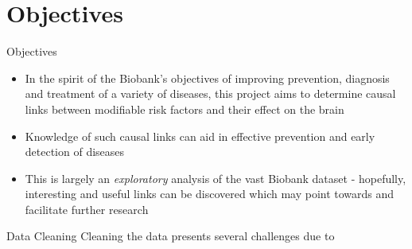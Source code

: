 \documentclass[10pt]{beamer} %
\begin{document}
\section{Objectives}
\begin{frame}[plain]{Objectives}
\begin{itemize}
\item In the spirit of the Biobank's objectives of improving prevention, diagnosis and treatment of a variety of diseases, this project aims to determine causal links between modifiable risk factors and their effect on the brain \\

\vspace{0.4cm}

\item Knowledge of such causal links can aid in effective prevention and early detection of diseases

\vspace{0.4cm}


\item This is largely an \emph{exploratory} analysis of the vast Biobank dataset - hopefully, interesting and useful links can be discovered which may point towards and facilitate further research

\end{itemize}
\end{frame}




\begin{frame}[plain]{Data Cleaning}
Cleaning the data presents several challenges due to 









\end{frame}
\end{document}
